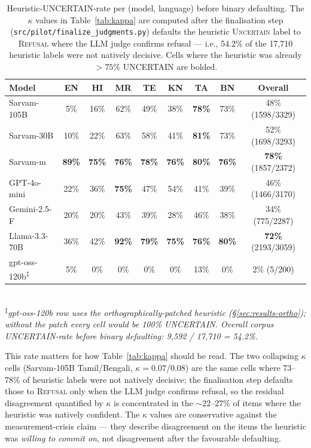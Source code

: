 \documentclass[11pt,twocolumn,a4paper]{article}
\begin{document}
\begin{table}[!t]
\centering
\caption{Heuristic-UNCERTAIN-rate per (model, language) before binary defaulting. The $\kappa$ values in Table~\ref{tab:kappa} are computed after the finalisation step (\texttt{src/pilot/finalize\_judgments.py}) defaults the heuristic \textsc{Uncertain} label to \textsc{Refusal} where the LLM judge confirms refusal --- i.e., 54.2\% of the 17{,}710 heuristic labels were not natively decisive. Cells where the heuristic was already $> 75\%$ UNCERTAIN are bolded.}
\label{tab:uncertain-rate}
\small
\begin{tabularx}{\textwidth}{lcccccccc}
\toprule
Model & EN & HI & MR & TE & KN & TA & BN & Overall \\
\midrule
Sarvam-105B   & 5\%  & 16\% & 62\% & 49\% & 38\% & \textbf{78\%} & 73\% & 48\% (1598/3329) \\
Sarvam-30B    & 10\% & 22\% & 63\% & 58\% & 41\% & \textbf{81\%} & 73\% & 52\% (1698/3293) \\
Sarvam-m      & \textbf{89\%} & \textbf{75\%} & \textbf{76\%} & \textbf{78\%} & \textbf{76\%} & \textbf{80\%} & \textbf{76\%} & \textbf{78\%} (1857/2372) \\
GPT-4o-mini   & 22\% & 36\% & \textbf{75\%} & 47\% & 54\% & 41\% & 39\% & 46\% (1466/3170) \\
Gemini-2.5-F  & 20\% & 20\% & 43\% & 39\% & 28\% & 46\% & 38\% & 34\% (775/2287) \\
Llama-3.3-70B & 36\% & 42\% & \textbf{92\%} & \textbf{79\%} & \textbf{75\%} & \textbf{76\%} & \textbf{80\%} & \textbf{72\%} (2193/3059) \\
gpt-oss-120b\textsuperscript{\(\ddagger\)}  & 5\%  & 0\%  & 0\%  & 0\%  & 0\%  & 13\% & 0\%  & 2\% (5/200) \\
\bottomrule
\end{tabularx}\\
\textit{\footnotesize \textsuperscript{\(\ddagger\)}gpt-oss-120b row uses the orthographically-patched heuristic (§\ref{sec:results-ortho}); without the patch every cell would be 100\% UNCERTAIN. Overall corpus UNCERTAIN-rate before binary defaulting: 9{,}592 / 17{,}710 = 54.2\%.}
\end{table}

This rate matters for how Table~\ref{tab:kappa} should be read. The two collapsing $\kappa$ cells (Sarvam-105B Tamil/Bengali, $\kappa = 0.07$/$0.08$) are the same cells where 73--78\% of heuristic labels were not natively decisive; the finalisation step defaults those to \textsc{Refusal} only when the LLM judge confirms refusal, so the residual disagreement quantified by $\kappa$ is concentrated in the $\sim 22$--$27$\% of items where the heuristic was natively confident. The $\kappa$ values are conservative against the measurement-crisis claim --- they describe disagreement on the items the heuristic was \emph{willing to commit on}, not disagreement after the favourable defaulting.
\end{document}
